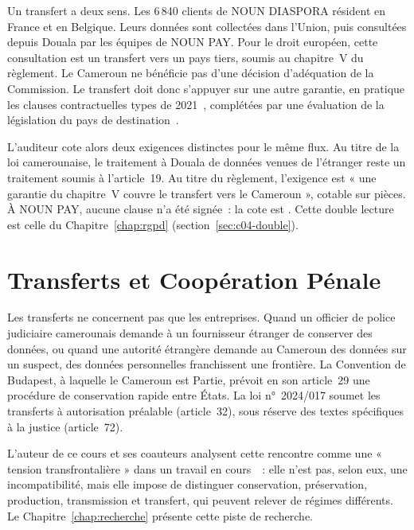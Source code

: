 Un transfert a deux sens. Les 6\,840 clients de NOUN DIASPORA résident en
France et en Belgique. Leurs données sont collectées dans l'Union, puis
consultées depuis Douala par les équipes de NOUN PAY. Pour le droit
européen, cette consultation est un transfert vers un pays tiers, soumis
au chapitre~V du règlement. Le Cameroun ne bénéficie pas d'une décision
d'adéquation de la Commission. Le transfert doit donc s'appuyer sur une
autre garantie, en pratique les clauses contractuelles types de
2021~\cite{ue2021clauses}, complétées par une évaluation de la législation
du pays de destination~\cite{edpb2020transferts}.

L'auditeur cote alors deux exigences distinctes pour le même flux. Au
titre de la loi camerounaise, le traitement à Douala de données venues de
l'étranger reste un traitement soumis à l'article~19. Au titre du
règlement, l'exigence est « une garantie du chapitre~V couvre le
transfert vers le Cameroun », cotable sur pièces. À NOUN PAY, aucune
clause n'a été signée~: la cote est \NON{}. Cette double lecture est
celle du Chapitre~\ref{chap:rgpd} (section~\ref{sec:c04-double}).

\section{Transferts et Coopération Pénale}
\label{sec:c11-penal}

Les transferts ne concernent pas que les entreprises. Quand un officier de
police judiciaire camerounais demande à un fournisseur étranger de
conserver des données, ou quand une autorité étrangère demande au Cameroun
des données sur un suspect, des données personnelles franchissent une
frontière. La Convention de Budapest, à laquelle le Cameroun est Partie,
prévoit en son article~29 une procédure de conservation rapide entre
États. La loi n°~2024/017 soumet les transferts à autorisation préalable
(article~32), sous réserve des textes spécifiques à la justice
(article~72).

L'auteur de ce cours et ses coauteurs analysent cette rencontre comme une
« tension transfrontalière » dans un travail en cours~\cite{minka2026chainepenale}~:
elle n'est pas, selon eux, une incompatibilité, mais elle impose de
distinguer conservation, préservation, production, transmission et
transfert, qui peuvent relever de régimes différents. Le
Chapitre~\ref{chap:recherche} présente cette piste de recherche.

